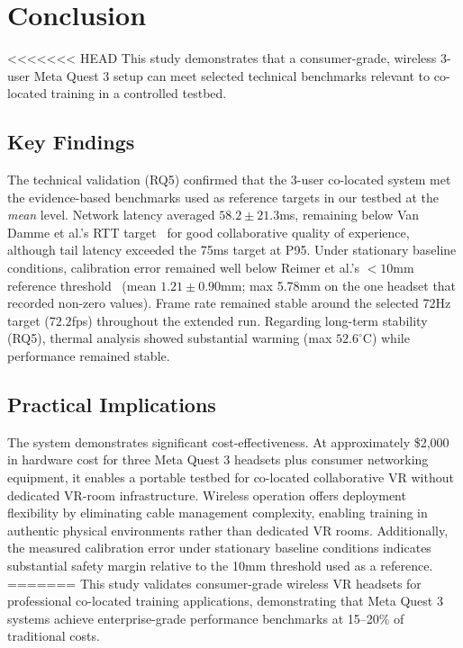 \section{Conclusion}

<<<<<<< HEAD
This study demonstrates that a consumer-grade, wireless 3-user Meta Quest 3 setup can meet selected technical benchmarks relevant to co-located training in a controlled testbed.

\subsection{Key Findings}

The technical validation (RQ5) confirmed that the 3-user co-located system met the evidence-based benchmarks used as reference targets in our testbed at the \emph{mean} level. Network latency averaged $58.2 \pm 21.3$ms, remaining below Van Damme et al.'s RTT target~\cite{VanDammeSam2024Iolo} for good collaborative quality of experience, although tail latency exceeded the 75ms target at P95. Under stationary baseline conditions, calibration error remained well below Reimer et al.'s $<10$mm reference threshold~\cite{ReimerDennis2021CfSV} (mean $1.21 \pm 0.90$mm; max 5.78mm on the one headset that recorded non-zero values). Frame rate remained stable around the selected 72Hz target ($72.2$fps) throughout the extended run. Regarding long-term stability (RQ5), thermal analysis showed substantial warming (max $52.6^{\circ}$C) while performance remained stable.

\subsection{Practical Implications}

The system demonstrates significant cost-effectiveness. At approximately \$2,000 in hardware cost for three Meta Quest 3 headsets plus consumer networking equipment, it enables a portable testbed for co-located collaborative VR without dedicated VR-room infrastructure. Wireless operation offers deployment flexibility by eliminating cable management complexity, enabling training in authentic physical environments rather than dedicated VR rooms. Additionally, the measured calibration error under stationary baseline conditions indicates substantial safety margin relative to the 10mm threshold used as a reference.
=======
This study validates consumer-grade wireless VR headsets for professional co-located training applications, demonstrating that Meta Quest 3 systems achieve enterprise-grade performance benchmarks at 15--20\% of traditional costs.

